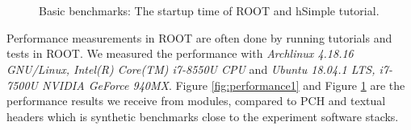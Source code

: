 \documentclass{webofc}
\begin{document}
\begin{figure}
\centering
    \begin{minipage}{.48\textwidth}
 　 \end{minipage}\hfill
    \begin{minipage}{.48\textwidth}
 　 \end{minipage}
\caption{Basic benchmarks: The startup time of ROOT and hSimple tutorial.}
\label{fig:performance2}
\end{figure}

Performance measurements in ROOT are often done by running tutorials and tests in ROOT.
We measured the performance with {\it Archlinux 4.18.16 GNU/Linux, Intel(R) Core(TM) i7-8550U CPU} and {\it Ubuntu 18.04.1 LTS, i7-7500U NVIDIA GeForce 940MX}.
Figure \ref{fig:performance1} and Figure \ref{fig:performance2} are the performance results we receive from modules, compared to PCH and textual headers which is synthetic benchmarks close to the experiment software stacks.
\end{document}
